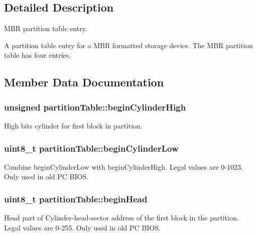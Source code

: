 \subsection{Detailed Description}
M\+BR partition table entry. 

A partition table entry for a M\+BR formatted storage device. The M\+BR partition table has four entries. 

\subsection{Member Data Documentation}
\subsubsection[{\texorpdfstring{begin\+Cylinder\+High}{beginCylinderHigh}}]{\setlength{\rightskip}{0pt plus 5cm}unsigned partition\+Table\+::begin\+Cylinder\+High}\hypertarget{structpartition_table_a744f0c7f9ad4c426b10de085b4f52392}{}\label{structpartition_table_a744f0c7f9ad4c426b10de085b4f52392}
High bits cylinder for first block in partition. 
\subsubsection[{\texorpdfstring{begin\+Cylinder\+Low}{beginCylinderLow}}]{\setlength{\rightskip}{0pt plus 5cm}uint8\+\_\+t partition\+Table\+::begin\+Cylinder\+Low}\hypertarget{structpartition_table_a941fcb4df298f5f73ccca011bf40787a}{}\label{structpartition_table_a941fcb4df298f5f73ccca011bf40787a}
Combine begin\+Cylinder\+Low with begin\+Cylinder\+High. Legal values are 0-\/1023. Only used in old PC B\+I\+OS. 
\subsubsection[{\texorpdfstring{begin\+Head}{beginHead}}]{\setlength{\rightskip}{0pt plus 5cm}uint8\+\_\+t partition\+Table\+::begin\+Head}\hypertarget{structpartition_table_a7d426694b8cf2151ae38568670a8c845}{}\label{structpartition_table_a7d426694b8cf2151ae38568670a8c845}
Head part of Cylinder-\/head-\/sector address of the first block in the partition. Legal values are 0-\/255. Only used in old PC B\+I\+OS. 

